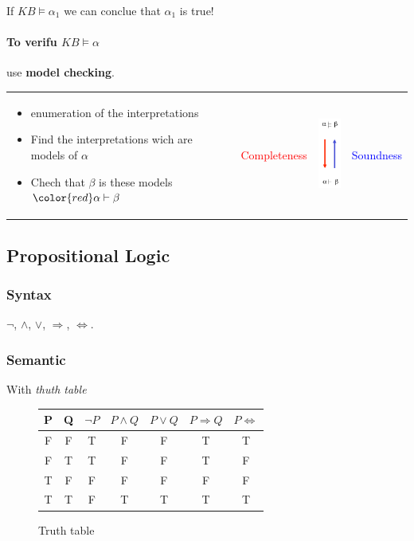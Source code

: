 If $KB \models \alpha_1$ we can conclue that $\alpha_1$ is true!


\paragraph{To verifu $KB \models \alpha$} use \textbf{model checking}.\\
\begin{tabular}{m{11cm}m{1cm}m{1.5cm}m{1cm}}
    \begin{itemize}
        \item enumeration of the interpretations
        \item Find the interpretations wich are models of $\alpha$
        \item Chech that $\beta$ is these models $\color{red} \alpha \vdash \beta$
    \end{itemize}
    &
    \textcolor{red}{Completeness}
    &
    \includegraphics[width=1cm]{soundness.png}
    &
    \textcolor{blue}{Soundness}
    \\
\end{tabular}


\subsection{Propositional Logic}

\subsubsection{Syntax}
$\neg$,
$\wedge$,
$\vee$, 
$\Rightarrow$, 
$\Leftrightarrow$.

\subsubsection{Semantic}
With \textit{thuth table}

\begin{figure}[h]
    \centering
    \begin{tabular}{|c|c||c|c|c|c|c|}
        \hline
        P & Q & $\neg P$ & $P \wedge Q$ & $P \vee Q$ & $P \Rightarrow Q$ & $P \Leftrightarrow$ \\
        \hline
        F & F & T & F & F & T & T \\
        F & T & T & F & F & T & F \\
        T & F & F & F & F & F & F \\
        T & T & F & T & T & T & T \\
        \hline
    \end{tabular}
    \caption{Truth table}
\end{figure}


